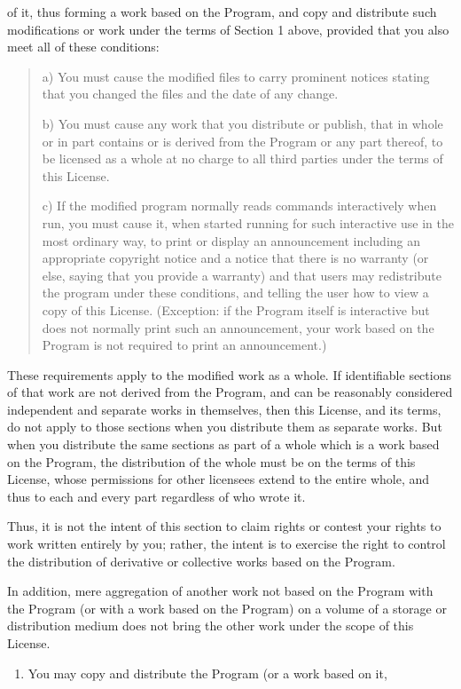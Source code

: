 \documentclass[letterpaper,10pt,english]{sphinxmanual}
\begin{document}
of it, thus forming a work based on the Program, and copy and
distribute such modifications or work under the terms of Section 1
above, provided that you also meet all of these conditions:
\begin{quote}

a) You must cause the modified files to carry prominent notices
stating that you changed the files and the date of any change.

b) You must cause any work that you distribute or publish, that in
whole or in part contains or is derived from the Program or any
part thereof, to be licensed as a whole at no charge to all third
parties under the terms of this License.

c) If the modified program normally reads commands interactively
when run, you must cause it, when started running for such
interactive use in the most ordinary way, to print or display an
announcement including an appropriate copyright notice and a
notice that there is no warranty (or else, saying that you provide
a warranty) and that users may redistribute the program under
these conditions, and telling the user how to view a copy of this
License.  (Exception: if the Program itself is interactive but
does not normally print such an announcement, your work based on
the Program is not required to print an announcement.)
\end{quote}

These requirements apply to the modified work as a whole.  If
identifiable sections of that work are not derived from the Program,
and can be reasonably considered independent and separate works in
themselves, then this License, and its terms, do not apply to those
sections when you distribute them as separate works.  But when you
distribute the same sections as part of a whole which is a work based
on the Program, the distribution of the whole must be on the terms of
this License, whose permissions for other licensees extend to the
entire whole, and thus to each and every part regardless of who wrote it.

Thus, it is not the intent of this section to claim rights or contest
your rights to work written entirely by you; rather, the intent is to
exercise the right to control the distribution of derivative or
collective works based on the Program.

In addition, mere aggregation of another work not based on the Program
with the Program (or with a work based on the Program) on a volume of
a storage or distribution medium does not bring the other work under
the scope of this License.
\begin{enumerate}
%
\setcounter{enumi}{2}
\item {} 
You may copy and distribute the Program (or a work based on it,

\end{enumerate}
\end{document}
